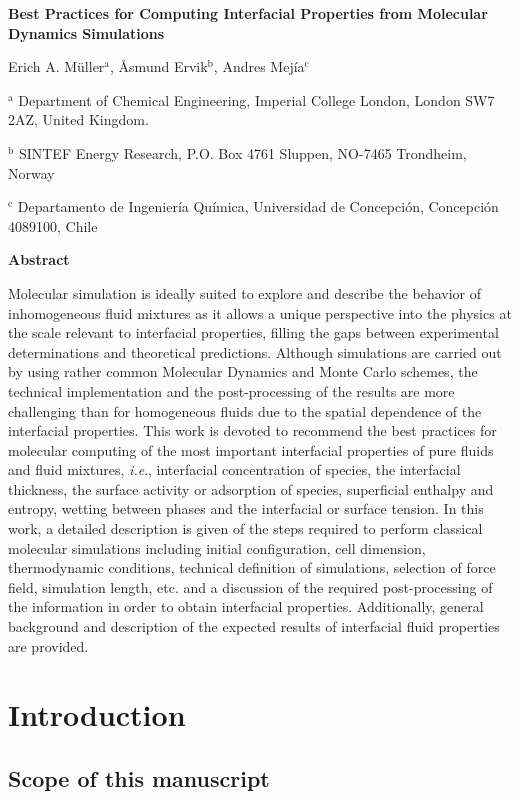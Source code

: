 \documentclass{scrbook}
\begin{document}
\textbf{Best Practices for Computing Interfacial Properties from Molecular Dynamics Simulations}

Erich A. M\"{u}ller$^{\mathrm{a}}$, \AA{}smund Ervik$^{\mathrm{b}}$, Andres Mej\'{i}a$^{\mathrm{c}}$

$^{\mathrm{a}}$ Department of Chemical Engineering, Imperial College London, London SW7 2AZ, United Kingdom.

$^{\mathrm{b}}$ SINTEF Energy Research, P.O. Box 4761 Sluppen, NO-7465 Trondheim, Norway

$^{\mathrm{c}}$ Departamento de Ingenier\'{i}a Qu\'{i}mica, Universidad de Concepci\'{o}n, Concepci\'{o}n 4089100, Chile

\textbf{Abstract}

Molecular simulation is ideally suited to explore and describe the behavior of inhomogeneous fluid mixtures as it allows a unique perspective into the physics at the scale relevant to interfacial properties, filling the gaps between experimental determinations and theoretical predictions. Although simulations are carried out by using rather common Molecular Dynamics and Monte Carlo schemes, the technical implementation and the post-processing of the results are more challenging than for homogeneous fluids due to the spatial dependence of the interfacial properties. This work is devoted to recommend the best practices for molecular computing of the most important interfacial properties of pure fluids and fluid mixtures, \textit{i.e}., interfacial concentration of species, the interfacial thickness, the surface activity or adsorption of species, superficial enthalpy and entropy, wetting between phases and the interfacial or surface tension. In this work, a detailed description is given of the steps required to perform classical molecular simulations including initial configuration, cell dimension, thermodynamic conditions, technical definition of simulations, selection of force field, simulation length, etc. and a discussion of the required post-processing of the information in order to obtain interfacial properties. Additionally, general background and description of the expected results of interfacial fluid properties are provided.   

\chapter{Introduction}

\section{Scope of this manuscript}
\end{document}
